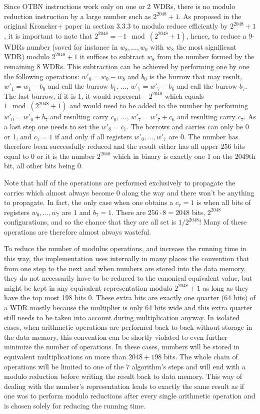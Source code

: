 Since OTBN instructions work only on one or 2 WDRs, there is no modulo reduction instruction by a large number such as $2^{2048} + 1$. As proposed in the original Kroneker+ paper \parencite{cryptoeprint:2020/1303} in section 3.3.3 to modulo reduce efficiently by $2^{2048} + 1$, it is important to note that $2^{2048} = -1 \mod (2^{2048} + 1)$, hence, to reduce a 9-WDRs number (saved for instance in $w_8, \ldots, w_0$ with $w_8$ the most significant WDR) modulo $2^{2048} + 1$ it suffices to subtract $w_8$ from the number formed by the remaining 8 WDRs. This subtraction can be achieved by performing one by one the following operations: $w'_0 = w_0 - w_8$ and $b_0$ is the burrow that may result, $w'_1 = w_1 - b_0$ and call the burrow $b_1$, $\ldots$, $w'_7 = w'_7 - b_6$ and call the burrow $b_7$. The last burrow, if it is 1, it would represent $-2^{2048}$ which equals $1 \mod (2^{2048} + 1)$ and would need to be added to the number by performing $w'_0 = w'_0 + b_7$ and resulting carry $c_0$, $\ldots$, $w'_7 = w'_7 + c_6$ and resulting carry $c_7$. As a last step one needs to set the $w'_8 = c_7$. The borrows and carries can only be 0 or 1, and $c_7 = 1$ if and only if all registers $w'_0, \ldots, w'_7$ are 0. The number has therefore been successfully reduced and the result either has all upper 256 bits equal to 0 or it is the number $2^{2048}$ which in binary is exactly one 1 on the 2049th bit, all other bits being 0. 

Note that half of the operations are performed exclusively to propagate the carries which almost always become 0 along the way and there won't be anything to propagate. In fact, the only case when one obtains a $c_7 = 1$ is when all bits of registers $w_0, \ldots, w_7$ are 1 and $b_7 = 1$. There are $256 \cdot 8 = 2048$ bits, $2^{2048}$ configurations, and so the chance that they are all set is $1 / 2^{2048}$! Many of these operations are therefore almost always wasteful.

To reduce the number of modulus operations, and increase the running time in this way, the implementation uses internally in many places the convention that from one step to the next and when numbers are stored into the data memory, they do not necessarily have to be reduced to the canonical equivalent value, but might be kept in any equivalent representation modulo $2^{2048} + 1$ as long as they have the top most 198 bits 0. These extra bits are exactly one quarter (64 bits) of a WDR mostly because the multiplier is only 64 bits wide and this extra quarter still needs to be taken into account during multiplication anyway. In isolated cases, when arithmetic operations are performed back to back without storage in the data memory, this convention can be shortly violated to even further minimize the number of operations. In these cases, numbers will be stored in equivalent multiplications on more than $2048 + 198$ bits. The whole chain of operations will be limited to one of the 7 algorithm's steps and will end with a modulo reduction before writing the result back to data memory. This way of dealing with the number's representation leads to exactly the same result as if one was to perform modulo reductions after every single arithmetic operation and is chosen solely for reducing the running time. 

